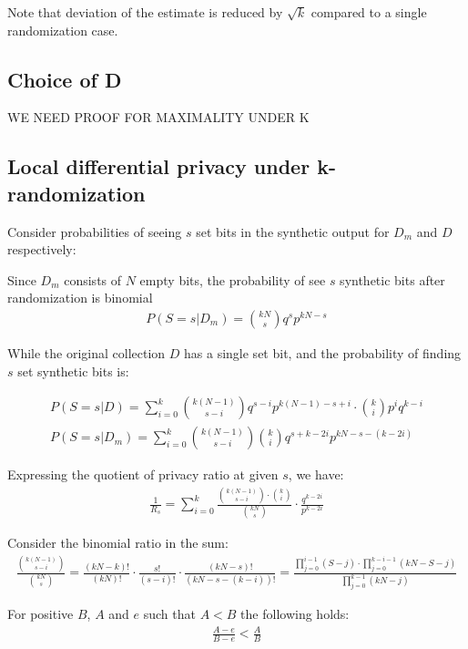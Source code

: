 \documentclass[11pt,draft]{article}
\begin{document}
Note that deviation of the estimate is reduced by $\sqrt{k}$ compared to a single randomization case.

\subsection{Choice of D}

WE NEED PROOF FOR MAXIMALITY UNDER K

\subsection{Local differential privacy under k-randomization}

Consider probabilities of seeing $s$ set bits in the synthetic output for $D_m$ and $D$ respectively:

Since $D_m$ consists of $N$ empty bits, the probability of see $s$ synthetic bits after randomization is binomial
\begin{align}
P(S=s | D_m ) = \binom{kN}{s}q^sp^{kN-s}
\end{align}

While the original collection $D$ has a single set bit, and the probability of finding $s$ set synthetic bits is:

\begin{align}
P(S=s | D ) = \sum_{i=0}^{k} \binom{k(N-1)}{s - i}q^{s-i}p^{k(N-1) - s + i} \cdot \binom{k}{i}p^iq^{k-i}  \\
P(S=s | D_m ) = \sum_{i=0}^{k}  \binom{k(N-1)}{s - i} \binom{k}{i} q^{s+k - 2i} p^{kN - s - (k-2i)}
\end{align}

Expressing the quotient of privacy ratio at given $s$, we have:
\begin{align}
\frac{1}{R_s} =  \sum_{i=0}^{k}  \frac{ \binom{k(N-1)}{s - i} \cdot \binom{k}{i} }{  \binom{kN}{s} }  \cdot \frac{q^{k-2i}} {p^{k-2i}}
\end{align}

Consider the binomial ratio in the sum:
\begin{align}
\frac{\binom{k(N-1)}{s - i} }{  \binom{kN}{s} } = \frac{(kN-k)!}{(kN)!}  \cdot \frac{s!}{(s-i)!}  \cdot \frac{(kN -s)!}{(kN - s - (k-i))!} = \frac{ \prod_{j=0}^{i-1} (S-j) \cdot \prod_{j=0}^{k-i-1} (kN - S-j) }{  \prod_{j=0}^{k-1} (kN -j) }
\end{align}

For positive $B$,  $A$ and $e$ such that $A < B$ the following holds:  
\begin{align}
\frac{A-e}{B-e} < \frac{A}{B}
\end{align}
\end{document}

